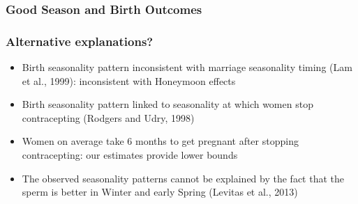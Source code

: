 \documentclass[10pt,letterpaper,subeqn]{beamer}
\begin{document}
\begin{frame}
\frametitle{Good Season and Birth Outcomes}
\begin{table}[htbp]\centering
  \caption{Birth Quality and Season of Birth (without controls)}
\end{table}
\end{frame}



\begin{frame}
\frametitle{Alternative explanations?}
\begin{itemize}
\item Birth seasonality pattern inconsistent with marriage seasonality timing (Lam et al., 1999): inconsistent with Honeymoon effects
\item Birth seasonality pattern linked to seasonality at which women stop contracepting (Rodgers and Udry,  1998)
\item Women on average take 6 months to get pregnant after stopping contracepting: our estimates provide lower bounds
\item The observed seasonality patterns cannot be explained by the fact that the sperm is better in Winter and early Spring (Levitas et al., 2013)
\end{itemize}
\end{frame}
\end{document}

